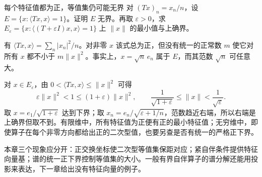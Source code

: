 \begin{example}{每个特征值都为正，等值集仍可能无界}
对 \((Tx)_n=x_n/n\)，设 \(E=\{x:\langle Tx,x\rangle=1\}\)。证明 \(E\) 无界。再取 \(\varepsilon>0\)，求 \(E_\varepsilon=\{x:\langle (T+\varepsilon I)x,x\rangle=1\}\) 上 \(\|x\|\) 的最小值与上确界。
\end{example}
\begin{solution}
有 \(\langle Tx,x\rangle=\sum_n |x_n|^2/n\)。对非零 \(x\) 该式总为正，但没有统一的正常数 \(m\) 使它对所有 \(x\) 都不小于 \(m\|x\|^2\)。事实上，\(x=\sqrt n\,e_n\) 属于 \(E\)，而其范数 \(\sqrt n\) 可任意大。

对 \(x\in E_\varepsilon\)，由 \(0<\langle Tx,x\rangle\leq\|x\|^2\) 可得
\[
 \varepsilon\|x\|^2<1\leq (1+\varepsilon)\|x\|^2,
 \qquad \frac1{\sqrt{1+\varepsilon}}\leq\|x\|
 <\frac1{\sqrt{\varepsilon}}.
\]
取 \(x=e_1/\sqrt{1+\varepsilon}\) 达到下界；取 \(x_n=e_n/\sqrt{\varepsilon+1/n}\)，范数趋近右端，所以右端是上确界但取不到。有限维中，所有特征值为正便有正的最小特征值；无穷维中，即使算子在每个非零方向都给出正的二次型值，也要另查是否有统一的严格正下界。
\end{solution}

本章三个现象应分开：正交换坐标使二次型等值集保距对应；紧自伴条件提供特征向量基；谱的统一正下界控制等值集的大小。一般有界自伴算子的谱分解还能用投影来表达，下一章给出没有特征向量的例子。
